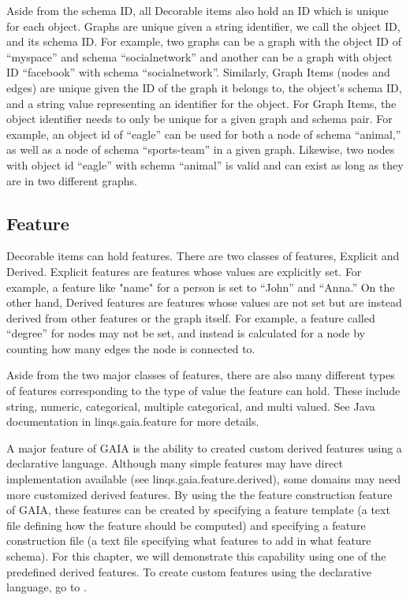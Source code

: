 Aside from the schema ID, all Decorable items also hold an ID which
is unique for each object.  Graphs are unique given a string identifier, we call
the object ID, and its schema ID.  For example, two graphs can be
a graph with the object ID of ``myspace'' and schema ``socialnetwork''
and another can be a graph with object ID ``facebook'' with schema ``socialnetwork''.
Similarly, Graph Items (nodes and edges) are
unique given the ID of the graph it belongs to, the object's schema ID,
and a string value representing an identifier for the object.  For Graph Items, the object
identifier needs to only be unique for a given graph and schema pair.  For example,
an object id of ``eagle'' can be used for both a node of schema ``animal,''
as well as a node of schema ``sports-team'' in a given graph.  Likewise,
two nodes with object id ``eagle'' with schema ``animal'' is valid and can exist
as long as they are in two different graphs.

\subsection{Feature}
\label{feature}
Decorable items can hold features.  There are two classes of features,
Explicit and Derived.  Explicit features are features whose values
are explicitly set.  For example, a feature like "name" for a person
is set to ``John'' and ``Anna.'' On the other hand, Derived features are features
whose values are not set but are instead derived from other features
or the graph itself.  For example, a feature called ``degree'' for nodes
may not be set, and instead is calculated for a node by counting
how many edges the node is connected to.

Aside from the two major classes of features, there are also many
different types of features corresponding to the type of value the
feature can hold.  These include string, numeric, categorical,
multiple categorical, and multi valued.
See Java documentation in linqs.gaia.feature for more details.

A major feature of GAIA is the ability to created custom derived features using
a declarative language.  Although many simple features may have direct
implementation available (see linqs.gaia.feature.derived), some domains
may need more customized derived features.  By using the the
feature construction feature of GAIA, these features can be created by
specifying a feature template (a text file defining how the feature should be computed)
and specifying a feature construction file (a text file specifying what features to add in
what feature schema).  For this chapter, we will demonstrate this capability using
one of the predefined derived features.  To create custom features using
the declarative language, go to .

